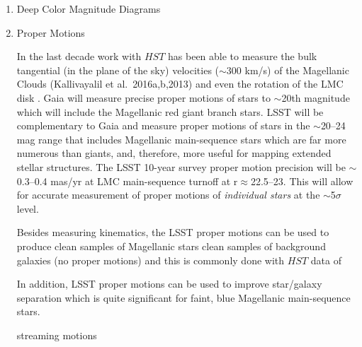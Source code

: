 \begin{enumerate}

\item Deep Color Magnitude Diagrams


\item Proper Motions

In the last decade work with $HST$ has been able to measure the bulk
tangential (in the plane of the sky) velocities ($\sim$300 km/s) of
the Magellanic Clouds (Kallivayalil et al.\ 2016a,b,2013) and even the
rotation of the LMC disk \citep{2014ApJ...781..121V}. Gaia
will measure precise proper motions of stars to $\sim$20th magnitude
which will include the Magellanic red giant branch stars. LSST will be
complementary to Gaia and measure proper motions of stars in the
$\sim$20--24 mag range that includes Magellanic main-sequence stars
which are far more numerous than giants, and, therefore, more useful
for mapping extended stellar structures. The LSST 10-year survey
proper motion precision will be $\sim$0.3--0.4 mas/yr at LMC
main-sequence turnoff at r$\approx$22.5--23.  This will allow for
accurate measurement of proper motions of {\em individual stars} at the
$\sim$5$\sigma$ level.

Besides measuring kinematics, the LSST proper motions can be used to
produce clean samples of Magellanic stars clean samples of background
galaxies (no proper motions) and this is commonly done with $HST$ data
of

In addition, LSST proper motions can be used to improve star/galaxy
separation which is quite significant for faint, blue Magellanic
main-sequence stars.

streaming motions

%
%




\end{enumerate}
